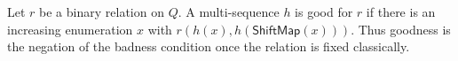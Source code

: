 \begin{definition}
Let $r$ be a binary relation on $Q$.  A multi-sequence $h$ is good for $r$ if
there is an increasing enumeration $x$ with
$r(h(x),h(\mathsf{ShiftMap}(x)))$.  Thus goodness is the negation of the
badness condition once the relation is fixed classically.
\end{definition}
